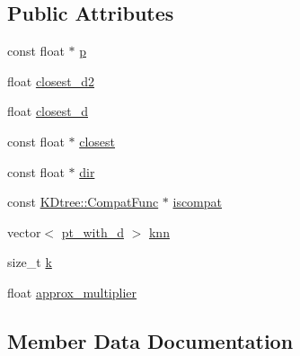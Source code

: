 \subsection*{Public Attributes}
\begin{DoxyCompactItemize}
\item 
const float $\ast$ \hyperlink{structtrimesh_1_1KDtree_1_1Node_1_1Traversal__Info_a297a6f379987e53da7395e6a9498e16c}{p}
\item 
float \hyperlink{structtrimesh_1_1KDtree_1_1Node_1_1Traversal__Info_a532ad5209c6ca76863e9c3b3c195c7a5}{closest\+\_\+d2}
\item 
float \hyperlink{structtrimesh_1_1KDtree_1_1Node_1_1Traversal__Info_a7d7d335558e2ce31ffaa5cc7588c1b5d}{closest\+\_\+d}
\item 
const float $\ast$ \hyperlink{structtrimesh_1_1KDtree_1_1Node_1_1Traversal__Info_aff348a021f69670e8c19efc5a2f2a805}{closest}
\item 
const float $\ast$ \hyperlink{structtrimesh_1_1KDtree_1_1Node_1_1Traversal__Info_a9a9765356660ff503075d9d38384532d}{dir}
\item 
const \hyperlink{structtrimesh_1_1KDtree_1_1CompatFunc}{K\+Dtree\+::\+Compat\+Func} $\ast$ \hyperlink{structtrimesh_1_1KDtree_1_1Node_1_1Traversal__Info_a844446012602379d373dcd82dcd8a71c}{iscompat}
\item 
vector$<$ \hyperlink{namespacetrimesh_ab64100c6e8b0f92c8b80af7e509bd6d9}{pt\+\_\+with\+\_\+d} $>$ \hyperlink{structtrimesh_1_1KDtree_1_1Node_1_1Traversal__Info_a3dcf9e4adb34d06b87ffb44b2e2fc337}{knn}
\item 
size\+\_\+t \hyperlink{structtrimesh_1_1KDtree_1_1Node_1_1Traversal__Info_ac61a88ee2e74986329b5505be77e84a5}{k}
\item 
float \hyperlink{structtrimesh_1_1KDtree_1_1Node_1_1Traversal__Info_a61cbba8e83e47a1faab0ea5de3d9d081}{approx\+\_\+multiplier}
\end{DoxyCompactItemize}


\subsection{Member Data Documentation}
\mbox{\label{structtrimesh_1_1KDtree_1_1Node_1_1Traversal__Info_a61cbba8e83e47a1faab0ea5de3d9d081}} 
